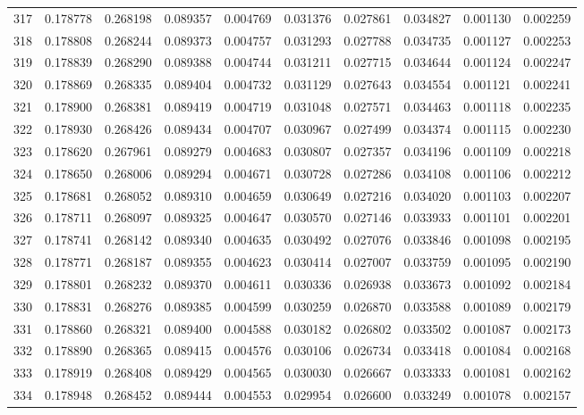 \begin{tabular}{lrrrrrrrrr}
317 & 0.178778 & 0.268198 & 0.089357 & 0.004769 & 0.031376 & 0.027861 & 0.034827 & 0.001130 & 0.002259 \\
318 & 0.178808 & 0.268244 & 0.089373 & 0.004757 & 0.031293 & 0.027788 & 0.034735 & 0.001127 & 0.002253 \\
319 & 0.178839 & 0.268290 & 0.089388 & 0.004744 & 0.031211 & 0.027715 & 0.034644 & 0.001124 & 0.002247 \\
320 & 0.178869 & 0.268335 & 0.089404 & 0.004732 & 0.031129 & 0.027643 & 0.034554 & 0.001121 & 0.002241 \\
321 & 0.178900 & 0.268381 & 0.089419 & 0.004719 & 0.031048 & 0.027571 & 0.034463 & 0.001118 & 0.002235 \\
322 & 0.178930 & 0.268426 & 0.089434 & 0.004707 & 0.030967 & 0.027499 & 0.034374 & 0.001115 & 0.002230 \\
323 & 0.178620 & 0.267961 & 0.089279 & 0.004683 & 0.030807 & 0.027357 & 0.034196 & 0.001109 & 0.002218 \\
324 & 0.178650 & 0.268006 & 0.089294 & 0.004671 & 0.030728 & 0.027286 & 0.034108 & 0.001106 & 0.002212 \\
325 & 0.178681 & 0.268052 & 0.089310 & 0.004659 & 0.030649 & 0.027216 & 0.034020 & 0.001103 & 0.002207 \\
326 & 0.178711 & 0.268097 & 0.089325 & 0.004647 & 0.030570 & 0.027146 & 0.033933 & 0.001101 & 0.002201 \\
327 & 0.178741 & 0.268142 & 0.089340 & 0.004635 & 0.030492 & 0.027076 & 0.033846 & 0.001098 & 0.002195 \\
328 & 0.178771 & 0.268187 & 0.089355 & 0.004623 & 0.030414 & 0.027007 & 0.033759 & 0.001095 & 0.002190 \\
329 & 0.178801 & 0.268232 & 0.089370 & 0.004611 & 0.030336 & 0.026938 & 0.033673 & 0.001092 & 0.002184 \\
330 & 0.178831 & 0.268276 & 0.089385 & 0.004599 & 0.030259 & 0.026870 & 0.033588 & 0.001089 & 0.002179 \\
331 & 0.178860 & 0.268321 & 0.089400 & 0.004588 & 0.030182 & 0.026802 & 0.033502 & 0.001087 & 0.002173 \\
332 & 0.178890 & 0.268365 & 0.089415 & 0.004576 & 0.030106 & 0.026734 & 0.033418 & 0.001084 & 0.002168 \\
333 & 0.178919 & 0.268408 & 0.089429 & 0.004565 & 0.030030 & 0.026667 & 0.033333 & 0.001081 & 0.002162 \\
334 & 0.178948 & 0.268452 & 0.089444 & 0.004553 & 0.029954 & 0.026600 & 0.033249 & 0.001078 & 0.002157 \\

\end{tabular}
